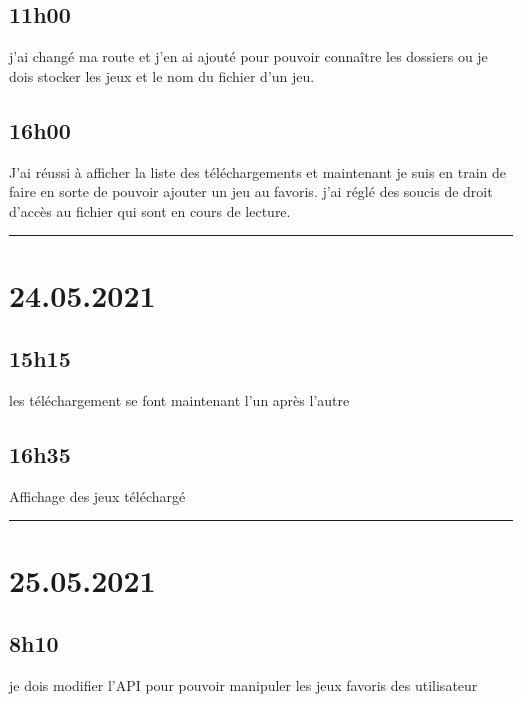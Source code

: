 \documentclass[a4paper,12pt,french]{sphinxmanual}
\begin{document}
\subsection{11h00}
\label{\detokenize{logbook:id144}}
\sphinxAtStartPar
j’ai changé ma route et j’en ai ajouté pour pouvoir connaître les dossiers ou je dois stocker les jeux et le nom du fichier d’un jeu.


\subsection{16h00}
\label{\detokenize{logbook:id145}}
\sphinxAtStartPar
J’ai réussi à afficher la liste des téléchargements  et maintenant  je suis en train de faire en sorte de pouvoir ajouter un jeu au favoris. j’ai réglé des soucis de droit d’accès au fichier qui sont en cours de lecture.


\bigskip\hrule\bigskip



\section{24.05.2021}
\label{\detokenize{logbook:id146}}

\subsection{15h15}
\label{\detokenize{logbook:id147}}
\sphinxAtStartPar
les téléchargement se font maintenant l’un après l’autre


\subsection{16h35}
\label{\detokenize{logbook:id148}}
\sphinxAtStartPar
Affichage des jeux téléchargé


\bigskip\hrule\bigskip



\section{25.05.2021}
\label{\detokenize{logbook:id149}}

\subsection{8h10}
\label{\detokenize{logbook:id150}}
\sphinxAtStartPar
je dois modifier l’API pour pouvoir manipuler les jeux favoris des utilisateur
\end{document}
